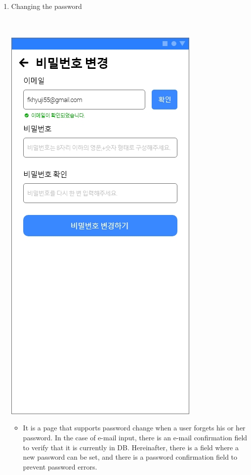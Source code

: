 \documentclass[conference]{IEEEtran}
\begin{document}
\begin{enumerate}
    \item Changing the password \\ \\ \\
    \centerline{\includegraphics[scale=0.32]{assets/비밀번호 변경.jpg}}
    \begin{itemize}
    \item[] It is a page that supports password change when a user forgets his or her password. In the case of e-mail input, there is an e-mail confirmation field to verify that it is currently in DB. Hereinafter, there is a field where a new password can be set, and there is a password confirmation field to prevent password errors. \\ \\ 
    \end{itemize}
    \end{enumerate}
    
\end{document}
